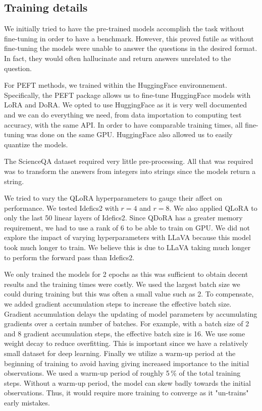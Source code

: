 \documentclass{article}
\begin{document}
\subsection{Training details}

We initially tried to have the pre-trained models accomplish the task without fine-tuning in order to have a benchmark. However, this proved futile as without fine-tuning the models were unable to answer the questions in the desired format. In fact, they would often hallucinate and return answers unrelated to the question.

For PEFT methods, we trained within the HuggingFace environnement. Specifically, the PEFT package allows us to fine-tune HuggingFace models with LoRA and DoRA. We opted to use HuggingFace as it is very well documented and we can do everything we need, from data importation to computing test accuracy, with the same API. In order to have comparable training times, all fine-tuning was done on the same GPU. HuggingFace also allowed us to easily quantize the models.

The ScienceQA dataset required very little pre-processing. All that was required was to transform the answers from integers into strings since the models return a string.

We tried to vary the QLoRA hyperparameters to gauge their affect on performance. We tested Idefics2 with $r=4$ and $r=8$. We also applied QLoRA to only the last 50 linear layers of Idefics2. Since QDoRA has a greater memory requirement, we had to use a rank of 6 to be able to train on GPU. We did not explore the impact of varying hyperparameters with LLaVA because this model took much longer to train. We believe this is due to LLaVA taking much longer to perform the forward pass than Idefics2.

We only trained the models for 2 epochs as this was sufficient to obtain decent results and the training times were costly. We used the largest batch size we could during training but this was often a small value such as 2. To compensate, we added gradient accumulation steps to increase the effective batch size. Gradient accumulation delays the updating of model parameters by accumulating gradients over a certain number of batches. For example, with a batch size of 2 and 8 gradient accumulation steps, the effective batch size is 16. We use some weight decay to reduce overfitting. This is important since we have a relatively small dataset for deep learning. Finally we utilize a warm-up period at the beginning of training to avoid having giving increased importance to the initial observations. We used a warm-up period of roughly 5\,\% of the total training steps. Without a warm-up period, the model can skew badly towards the initial observations. Thus, it would require more training to converge as it "un-trains" early mistakes.
\end{document}
